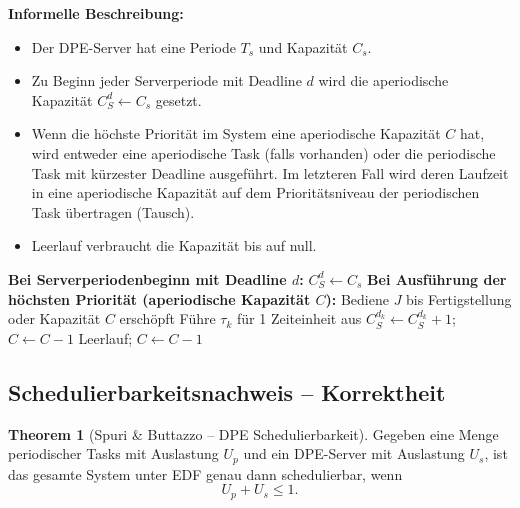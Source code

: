 ﻿\documentclass[a4paper,12pt]{report}
\theoremstyle{definition}
\newtheorem{theorem}{Theorem}[chapter]
\begin{document}
\textbf{Informelle Beschreibung:}

\begin{itemize}
	\item Der DPE-Server hat eine Periode $T_s$ und Kapazität $C_s$.
	\item Zu Beginn jeder Serverperiode mit Deadline $d$ wird die aperiodische
	      Kapazität $C_S^d \leftarrow C_s$ gesetzt.
	\item Wenn die höchste Priorität im System eine aperiodische Kapazität $C$
	      hat, wird entweder eine aperiodische Task (falls vorhanden) oder die
	      periodische Task mit kürzester Deadline ausgeführt. Im letzteren Fall
	      wird deren Laufzeit in eine aperiodische Kapazität auf dem Prioritätsniveau
	      der periodischen Task übertragen (Tausch).
	\item Leerlauf verbraucht die Kapazität bis auf null.
\end{itemize}

\begin{algorithm}[H]
	\caption{DPE Server -- Ereignisbehandlung}
	\begin{algorithmic}[1]
		\State \textbf{Bei Serverperiodenbeginn mit Deadline $d$:}
		\State $C_S^d \leftarrow C_s$
		\State
		\State \textbf{Bei Ausführung der höchsten Priorität (aperiodische Kapazität $C$):}
		\State Bediene $J$ bis Fertigstellung oder Kapazität $C$ erschöpft
		\State Führe $\tau_k$ für 1 Zeiteinheit aus
		\State $C_S^{d_k} \leftarrow C_S^{d_k} + 1$; $C \leftarrow C - 1$
		\Else
		\State Leerlauf; $C \leftarrow C - 1$
		\EndIf
	\end{algorithmic}
\end{algorithm}

\subsection{Schedulierbarkeitsnachweis -- Korrektheit}

\begin{theorem}[Spuri \& Buttazzo -- DPE Schedulierbarkeit]
	\label{thm:dpe}
	Gegeben eine Menge periodischer Tasks mit Auslastung $U_p$ und ein DPE-Server
	mit Auslastung $U_s$, ist das gesamte System unter EDF genau dann schedulierbar,
	wenn
	\[
		U_p + U_s \leq 1.
	\]
\end{theorem}
\end{document}
